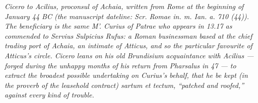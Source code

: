 
\textit{Cicero to Acilius, proconsul of Achaia, written from Rome
at the beginning of January 44 BC (the manuscript dateline:
\textit{Scr. Romae in. m. Ian. a. 710 (44)}). The beneficiary is
the same M'. Curius of Patrae who appears in 13.17 as commended
to Servius Sulpicius Rufus: a Roman businessman based at the chief
trading port of Achaia, an intimate of Atticus, and so the
particular favourite of Atticus's circle. Cicero leans on his
old Brundisium acquaintance with Acilius --- forged during the
unhappy months of his return from Pharsalus in 47 --- to extract
the broadest possible undertaking on Curius's behalf, that he be
kept (in the proverb of the leasehold contract) \textit{sartum et
tectum}, ``patched and roofed,'' against every kind of trouble.}

